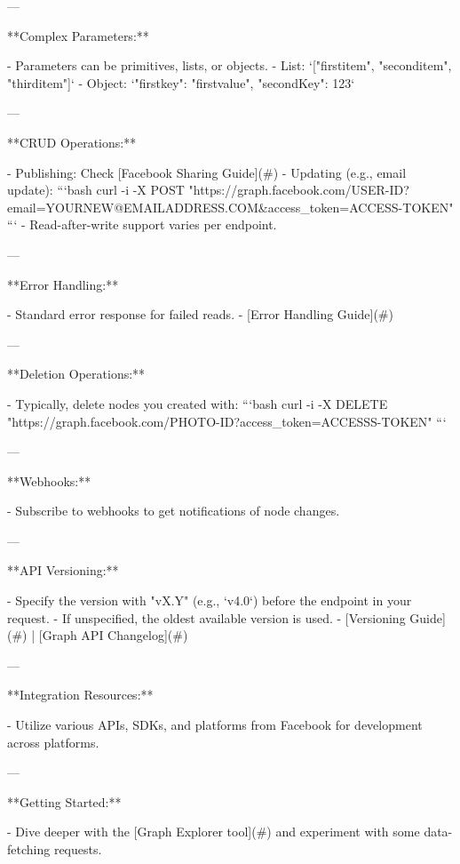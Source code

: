 ---

**Complex Parameters:**

- Parameters can be primitives, lists, or objects.
- List: `["firstitem", "seconditem", "thirditem"]`
- Object: `{"firstkey": "firstvalue", "secondKey": 123}`

---

**CRUD Operations:**

- Publishing: Check [Facebook Sharing Guide](#)
- Updating (e.g., email update):
```bash
curl -i -X POST "https://graph.facebook.com/USER-ID?email=YOURNEW@EMAILADDRESS.COM&access_token=ACCESS-TOKEN"
```
- Read-after-write support varies per endpoint.

---

**Error Handling:**

- Standard error response for failed reads.
- [Error Handling Guide](#)

---

**Deletion Operations:**

- Typically, delete nodes you created with:
```bash
curl -i -X DELETE "https://graph.facebook.com/PHOTO-ID?access_token=ACCESSS-TOKEN"
```

---

**Webhooks:**

- Subscribe to webhooks to get notifications of node changes.

---

**API Versioning:**

- Specify the version with "vX.Y" (e.g., `v4.0`) before the endpoint in your request.
- If unspecified, the oldest available version is used.
- [Versioning Guide](#) | [Graph API Changelog](#)

---

**Integration Resources:**

- Utilize various APIs, SDKs, and platforms from Facebook for development across platforms.

---

**Getting Started:**

- Dive deeper with the [Graph Explorer tool](#) and experiment with some data-fetching requests.